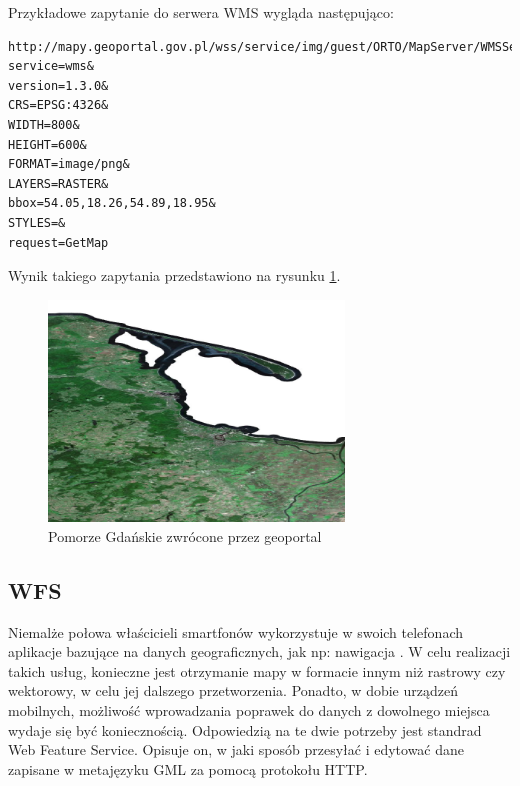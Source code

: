 Przykładowe zapytanie do serwera WMS wygląda następująco: 

\begin{lstlisting}[frame=single]
http://mapy.geoportal.gov.pl/wss/service/img/guest/ORTO/MapServer/WMSServer?
service=wms&
version=1.3.0&
CRS=EPSG:4326&
WIDTH=800&
HEIGHT=600&
FORMAT=image/png&
LAYERS=RASTER&
bbox=54.05,18.26,54.89,18.95&
STYLES=&
request=GetMap
\end{lstlisting}

Wynik takiego zapytania przedstawiono na rysunku \ref{fig:pomorze_gdanskie}.

\begin{figure}[h!]
    \centering
    \includegraphics[width=0.7\textwidth]{img/pomorze_gdanskie.png}
    \caption{Pomorze Gdańskie zwrócone przez geoportal}
    \label{fig:pomorze_gdanskie}
\end{figure}

\subsection{WFS}

Niemalże połowa właścicieli smartfonów wykorzystuje w swoich telefonach aplikacje bazujące na danych geograficznych, jak np: nawigacja \cite{duggan2013}.
W celu realizacji takich usług, konieczne jest otrzymanie mapy w formacie innym niż rastrowy czy wektorowy, w celu jej dalszego przetworzenia.
Ponadto, w dobie urządzeń mobilnych, możliwość wprowadzania poprawek do danych z dowolnego miejsca wydaje się być koniecznością.
Odpowiedzią na te dwie potrzeby jest standrad Web Feature Service.
Opisuje on, w jaki sposób przesyłać i edytować dane zapisane w metajęzyku GML za pomocą protokołu HTTP.

